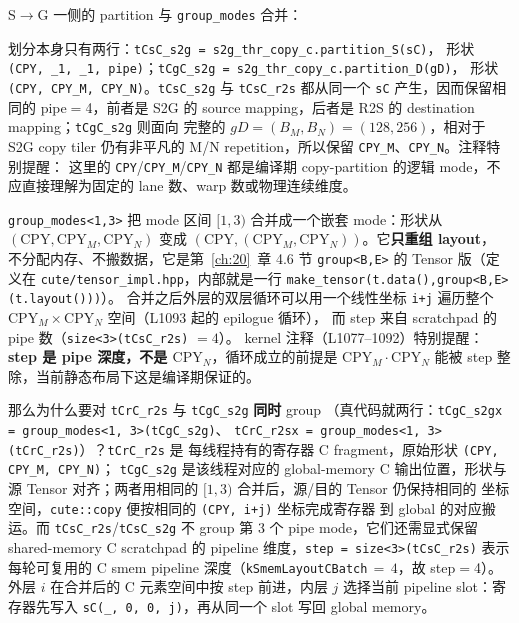 S$\to$G 一侧的 partition 与 \texttt{group\_modes} 合并：

\begin{sloppypar}
划分本身只有两行：\texttt{tCsC\_s2g = s2g\_thr\_copy\_c.partition\_S(sC)}，
形状 \texttt{(CPY, \_1, \_1, pipe)}；\texttt{tCgC\_s2g = s2g\_thr\_copy\_c.partition\_D(gD)}，
形状 \texttt{(CPY, CPY\_M, CPY\_N)}。\texttt{tCsC\_s2g} 与 \texttt{tCsC\_r2s}
都从同一个 \texttt{sC} 产生，因而保留相同的 pipe$=$4，前者是 S2G 的
source mapping，后者是 R2S 的 destination mapping；\texttt{tCgC\_s2g} 则面向
完整的 $gD = (B_M, B_N) = (128, 256)$，相对于 S2G copy tiler 仍有非平凡的
M/N repetition，所以保留 \texttt{CPY\_M}、\texttt{CPY\_N}。注释特别提醒：
这里的 \texttt{CPY}/\texttt{CPY\_M}/\texttt{CPY\_N} 都是编译期 copy-partition
的逻辑 mode，不应直接理解为固定的 lane 数、warp 数或物理连续维度。
\end{sloppypar}

\begin{sloppypar}
\texttt{group\_\allowbreak{}modes\allowbreak{}<1,\allowbreak{}3>} 把 mode 区间 $[1,3)$ 合并成一个嵌套 mode：形状从
$(\mathrm{CPY}, \mathrm{CPY}_M, \mathrm{CPY}_N)$ 变成
$(\mathrm{CPY}, (\mathrm{CPY}_M, \mathrm{CPY}_N))$。它\textbf{只重组 layout}，
不分配内存、不搬数据，它是第~\ref{ch:20}~章 4.6 节 \texttt{group<B,E>}
的 Tensor 版（定义在 \texttt{cute/\allowbreak{}tensor\_\allowbreak{}impl.\allowbreak{}hpp}，内部就是一行
\texttt{make\_\allowbreak{}tensor\allowbreak{}(t.\allowbreak{}data\allowbreak{}(),\allowbreak{}}\allowbreak\texttt{group\allowbreak{}<B,\allowbreak{}E>\allowbreak{}(t.\allowbreak{}layout\allowbreak{}()))}）。
合并之后外层的双层循环可以用一个线性坐标 \texttt{i+j} 遍历整个
$\mathrm{CPY}_M\times\mathrm{CPY}_N$ 空间（L1093 起的 epilogue 循环），
而 step 来自 scratchpad 的 pipe 数（\texttt{size\allowbreak{}<3>\allowbreak{}(t\allowbreak{}Cs\allowbreak{}C\_\allowbreak{}r2s)} $=4$）。
kernel 注释（L1077--1092）特别提醒：\textbf{step 是 pipe 深度，不是
$\mathrm{CPY}_N$}，循环成立的前提是 $\mathrm{CPY}_M\cdot\mathrm{CPY}_N$ 能被
step 整除，当前静态布局下这是编译期保证的。
\end{sloppypar}

\begin{sloppypar}
那么为什么要对 \texttt{tCrC\_r2s} 与 \texttt{tCgC\_s2g} \textbf{同时} group
（真代码就两行：\texttt{tCgC\_s2gx = group\_modes<1, 3>(tCgC\_s2g)}、
\texttt{tCrC\_r2sx = group\_modes<1, 3>(tCrC\_r2s)}）？\texttt{tCrC\_r2s} 是
每线程持有的寄存器 C fragment，原始形状 \texttt{(CPY, CPY\_M, CPY\_N)}；
\texttt{tCgC\_s2g} 是该线程对应的 global-memory C 输出位置，形状与源
Tensor 对齐；两者用相同的 $[1,3)$ 合并后，源/目的 Tensor 仍保持相同的
坐标空间，\texttt{cute::copy} 便按相同的 \texttt{(CPY, i+j)} 坐标完成寄存器
到 global 的对应搬运。而 \texttt{tCsC\_r2s}/\texttt{tCsC\_s2g} 不 group
第 3 个 pipe mode，它们还需显式保留 shared-memory C scratchpad 的
pipeline 维度，\texttt{step = size<3>(tCsC\_r2s)} 表示每轮可复用的 C
smem pipeline 深度（\texttt{kSmemLayoutCBatch}$\,{=}\,4$，故 step$=$4）。
外层 $i$ 在合并后的 C 元素空间中按 step 前进，内层 $j$ 选择当前 pipeline
slot：寄存器先写入 \texttt{sC(\_, 0, 0, j)}，再从同一个 slot 写回 global
memory。
\end{sloppypar}

